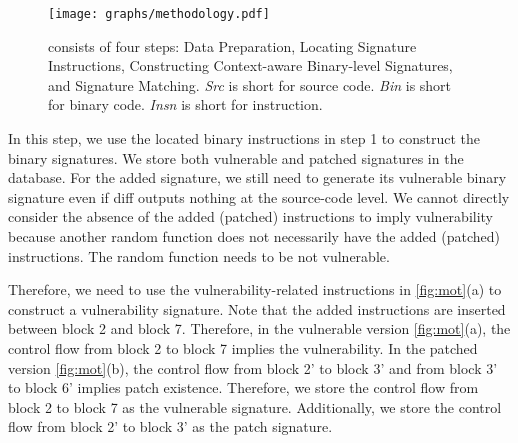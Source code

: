 \begin{figure*}[!t]
\centering
\texttt{[image: graphs/methodology.pdf]}
\caption{\name consists of four steps: Data Preparation, Locating Signature
Instructions, Constructing Context-aware
Binary-level Signatures, and Signature Matching. \textit{Src} is short for source code. \textit{Bin} is short for binary code. \textit{Insn} is short for instruction.} 
\label{fig:methodology}
\end{figure*}


In this step, we use the located binary instructions in step 1 to construct the binary signatures. We store both vulnerable and patched signatures in the database.
For the added signature, we still need to generate its vulnerable binary signature even if diff outputs nothing at the source-code level. 
We cannot directly consider the absence of the added (patched) instructions to imply vulnerability because another random function does not necessarily have the added (patched) instructions. 
The random function needs to be not vulnerable. 

Therefore, we need to use the vulnerability-related instructions in \autoref{fig:mot}(a) to construct a vulnerability signature. 
Note that the added instructions are inserted between block 2 and block 7. 
Therefore, in the vulnerable version \autoref{fig:mot}(a), the control flow from block 2 to block 7 implies the vulnerability. 
In the patched version \autoref{fig:mot}(b), the control flow from block 2' to block 3' and from block 3' to block 6' implies patch existence.  
Therefore, we store the control flow from block 2 to block 7 as the vulnerable signature. 
Additionally, we store the control flow from block 2' to block 3' as the patch signature.


